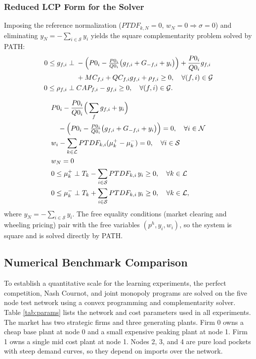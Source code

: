 \documentclass[lettersize,journal]{IEEEtran}
\begin{document}
\subsubsection{Reduced LCP Form for the Solver}

Imposing the reference normalization ($PTDF_{k,N} = 0$,
$w_N = 0 \Rightarrow \sigma = 0$) and eliminating
$y_N = -\sum_{i \in \mathcal{S}} y_i$ yields the square complementarity
problem solved by PATH:
\begin{align}
0 \le g_{f,i} \perp\;& -\Big(P0_i - \tfrac{P0_i}{Q0_i}\big( g_{f,i} + G_{-f,i} + y_i \big)\Big) + \frac{P0_i}{Q0_i} g_{f,i} \notag \\
& + MC_{f,i} + QC_{f,i} g_{f,i} + \rho_{f,i} \ge 0,
   \quad \forall (f,i) \in \mathcal{G} \\
0 \le \rho_{f,i} \perp\;& CAP_{f,i} - g_{f,i} \ge 0,
   \quad \forall (f,i) \in \mathcal{G}.
\end{align}

\begin{align}
& P0_i - \frac{P0_i}{Q0_i}\Big( \sum_{f} g_{f,i} + y_i \Big) \notag \\
& \quad {} - \Big(P0_i - \tfrac{P0_i}{Q0_i}\big( g_{f,i} + G_{-f,i} + y_i \big)\Big)
   = 0, \quad \forall i \in \mathcal{N} \\
& w_i - \sum_{k \in \mathcal{L}} PTDF_{k,i}(\mu_k^{+} - \mu_k^{-}) = 0,
   \quad \forall i \in \mathcal{S} \\
& w_N = 0 \\
& 0 \le \mu_k^{+} \perp T_k - \sum_{i \in \mathcal{S}} PTDF_{k,i}\, y_i \ge 0,
   \quad \forall k \in \mathcal{L} \\
& 0 \le \mu_k^{-} \perp T_k + \sum_{i \in \mathcal{S}} PTDF_{k,i}\, y_i \ge 0,
   \quad \forall k \in \mathcal{L},
\end{align}
where $y_N = -\sum_{i \in \mathcal{S}} y_i$. The free equality conditions
(market clearing and wheeling pricing) pair with the free variables
$(p^h, y_i, w_i)$, so the system is square and is solved directly by PATH.

\subsection{Numerical Benchmark Comparison}

To establish a quantitative scale for the learning experiments, the perfect competition, Nash Cournot, and joint monopoly programs are solved on the five node test network using a convex programming and complementarity solver. Table \ref{tab:params} lists the network and cost parameters used in all experiments. The market has two strategic firms and three generating plants. Firm 0 owns a cheap base plant at node 0 and a small expensive peaking plant at node 1. Firm 1 owns a single mid cost plant at node 1. Nodes 2, 3, and 4 are pure load pockets with steep demand curves, so they depend on imports over the network.
\end{document}
